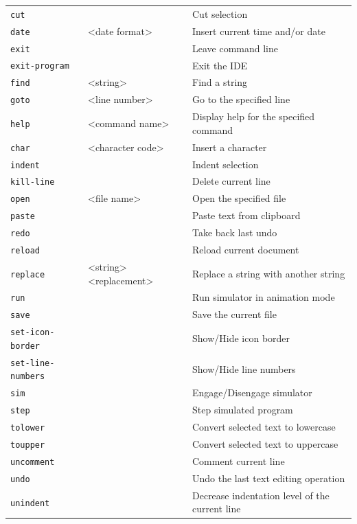 \documentclass[a4paper,twoside,12pt]{book}
\begin{document}
{\begin{longtable}{l|ll}
				\texttt{cut}		&			& Cut selection						\\
				\texttt{date}		& <date format>		& Insert current time and/or date			\\
				\texttt{exit}		&			& Leave command line					\\
				\texttt{exit-program}	&			& Exit the IDE						\\
				\texttt{find}		& <string>		& Find a string						\\
				\texttt{goto}		& <line number>		& Go to the specified line				\\
				\texttt{help}		& <command name>	& Display help for the specified command		\\
				\texttt{char}		& <character code>	& Insert a character					\\
				\texttt{indent}		&			& Indent selection					\\
				\texttt{kill-line}	&			& Delete current line					\\
				\texttt{open}		& <file name>		& Open the specified file				\\
				\texttt{paste}		&			& Paste text from clipboard 				\\
				\texttt{redo}		&			& Take back last undo					\\
				\texttt{reload}		&			& Reload current document				\\
				\texttt{replace}	& <string> <replacement>& Replace a string with another string			\\
				\texttt{run}		&			& Run simulator in animation mode			\\
				\texttt{save}		&			& Save the current file					\\
				\texttt{set-icon-border}&			& Show/Hide icon border					\\
				\texttt{set-line-numbers}&			& Show/Hide line numbers				\\
				\texttt{sim}		&			& Engage/Disengage simulator				\\
				\texttt{step}		&			& Step simulated program				\\
				\texttt{tolower}	&			& Convert selected text to lowercase			\\
				\texttt{toupper}	&			& Convert selected text to uppercase			\\
				\texttt{uncomment}	&			& Comment current line					\\
				\texttt{undo}		&			& Undo the last text editing operation			\\
				\texttt{unindent}	&			& Decrease indentation level of the current line	\\

\end{longtable}}
\end{document}
